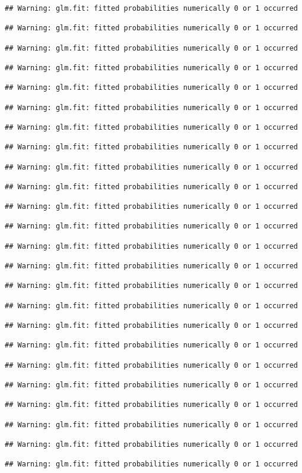 \documentclass[
]{article}
\begin{document}
\begin{verbatim}
## Warning: glm.fit: fitted probabilities numerically 0 or 1 occurred

## Warning: glm.fit: fitted probabilities numerically 0 or 1 occurred

## Warning: glm.fit: fitted probabilities numerically 0 or 1 occurred

## Warning: glm.fit: fitted probabilities numerically 0 or 1 occurred

## Warning: glm.fit: fitted probabilities numerically 0 or 1 occurred

## Warning: glm.fit: fitted probabilities numerically 0 or 1 occurred

## Warning: glm.fit: fitted probabilities numerically 0 or 1 occurred

## Warning: glm.fit: fitted probabilities numerically 0 or 1 occurred

## Warning: glm.fit: fitted probabilities numerically 0 or 1 occurred

## Warning: glm.fit: fitted probabilities numerically 0 or 1 occurred

## Warning: glm.fit: fitted probabilities numerically 0 or 1 occurred

## Warning: glm.fit: fitted probabilities numerically 0 or 1 occurred

## Warning: glm.fit: fitted probabilities numerically 0 or 1 occurred

## Warning: glm.fit: fitted probabilities numerically 0 or 1 occurred

## Warning: glm.fit: fitted probabilities numerically 0 or 1 occurred

## Warning: glm.fit: fitted probabilities numerically 0 or 1 occurred

## Warning: glm.fit: fitted probabilities numerically 0 or 1 occurred

## Warning: glm.fit: fitted probabilities numerically 0 or 1 occurred

## Warning: glm.fit: fitted probabilities numerically 0 or 1 occurred

## Warning: glm.fit: fitted probabilities numerically 0 or 1 occurred

## Warning: glm.fit: fitted probabilities numerically 0 or 1 occurred

## Warning: glm.fit: fitted probabilities numerically 0 or 1 occurred

## Warning: glm.fit: fitted probabilities numerically 0 or 1 occurred

## Warning: glm.fit: fitted probabilities numerically 0 or 1 occurred


\end{verbatim}
\end{document}
